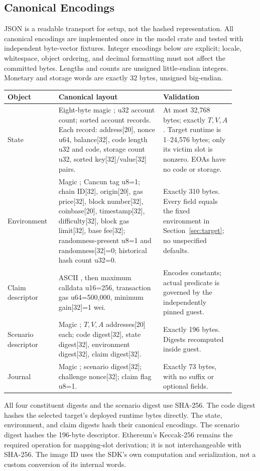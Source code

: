 \documentclass[11pt]{article}
\begin{document}
\subsection{Canonical Encodings}
JSON is a readable transport for setup, not the hashed representation. All canonical encodings are implemented once in the model crate and tested with independent byte-vector fixtures. Integer encodings below are explicit; locale, whitespace, object ordering, and decimal formatting must not affect the committed bytes. Lengths and counts are unsigned little-endian integers. Monetary and storage words are exactly 32 bytes, unsigned big-endian.

\begin{longtable}{L{0.21\linewidth}L{0.43\linewidth}L{0.26\linewidth}}
\toprule
\textbf{Object} & \textbf{Canonical layout} & \textbf{Validation} \\
\midrule
\endhead
State & Eight-byte magic ; u32 account count; sorted account records. Each record: address[20], nonce u64, balance[32], code length u32 and code, storage count u32, sorted key[32]/value[32] pairs. & At most 32,768 bytes; exactly \(T,V,A\). Target runtime is 1--24,576 bytes; only its victim slot is nonzero. EOAs have no code or storage. \\
Environment & Magic ; Cancun tag u8=1; chain ID[32], origin[20], gas price[32], block number[32], coinbase[20], timestamp[32], difficulty[32], block gas limit[32], base fee[32]; randomness-present u8=1 and randomness[32]=0; historical hash count u32=0. & Exactly 310 bytes. Every field equals the fixed environment in Section~\ref{sec:target}; no unspecified defaults. \\
Claim descriptor & ASCII , then maximum calldata u16=256, transaction gas u64=500,000, minimum gain[32]=1 wei. & Encodes constants; actual predicate is governed by the independently pinned guest. \\
Scenario descriptor & Magic ; \(T,V,A\) addresses[20] each; code digest[32], state digest[32], environment digest[32], claim digest[32]. & Exactly 196 bytes. Digests recomputed inside guest. \\
Journal & Magic ; scenario digest[32]; challenge nonce[32]; claim flag u8=1. & Exactly 73 bytes, with no suffix or optional fields. \\
\bottomrule
\end{longtable}

All four constituent digests and the scenario digest use SHA-256. The code digest hashes the selected target's deployed runtime bytes directly. The state, environment, and claim digests hash their canonical encodings. The scenario digest hashes the 196-byte descriptor. Ethereum's Keccak-256 remains the required operation for mapping-slot derivation; it is not interchangeable with SHA-256. The image ID uses the SDK's own computation and serialization, not a custom conversion of its internal words.
\end{document}

